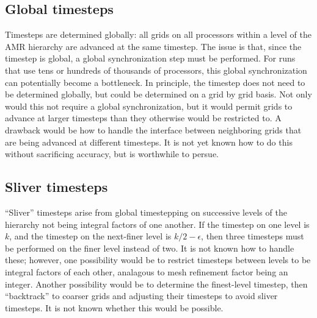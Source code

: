 \documentclass{article}
\begin{document}
\subsection{Global timesteps} \label{issue:method-timestep-global}

  Timesteps are determined globally: all grids on all processors
  within a level of the AMR hierarchy are advanced at the same
  timestep.  The issue is that, since the timestep is global, a global
  synchronization step must be performed.  For runs that use tens or
  hundreds of thousands of processors, this global synchronization can
  potentially become a bottleneck.  In principle, the timestep does
  not need to be determined globally, but could be determined on a
  grid by grid basis.  Not only would this not require a global
  synchronization, but it would permit grids to advance at larger
  timesteps than they otherwise would be restricted to.  A drawback
  would be how to handle the interface between neighboring grids that
  are being advanced at different timesteps.  It is not yet known how
  to do this without sacrificing accuracy, but is worthwhile to
  persue.

\subsection{Sliver timesteps} \label{issue:method-timestep-sliver}

  ``Sliver'' timesteps arise from global timestepping on successive
  levels of the hierarchy not being integral factors of one another.
  If the timestep on one level is $k$, and the timestep on the
  next-finer level is $k/2-\epsilon$, then three timesteps must be
  performed on the finer level instead of two.  It is not known how to
  handle these; however, one possibility would be to restrict
  timesteps between levels to be integral factors of each other,
  analagous to mesh refinement factor being an integer.  Another
  possibility would be to determine the finest-level timestep, then
  ``backtrack'' to coarser grids and adjusting their timesteps to
  avoid sliver timesteps.  It is not known whether this would be
  possible.

\end{document}
